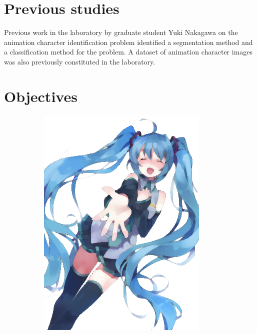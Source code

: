\section{Previous studies}
Previous work in the laboratory by graduate student Yuki Nakagawa on the animation character identification problem identified a segmentation method\cite{felzenszwalb2004efficient} and a classification method\cite{harchaoui2007image} for the problem. A dataset of animation character images was also previously constituted in the laboratory.


\section{Objectives}

\begin{figure}[htb!]
\centering
\begin{subfigure}{.3\textwidth}
\includegraphics[width=\textwidth]{images/miku_e.png}

\end{subfigure}
\end{figure}
